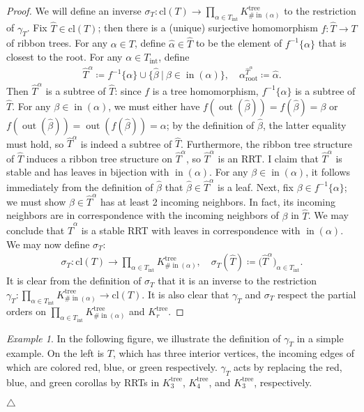\documentclass[11pt]{amsart}
\theoremstyle{definition}
\theoremstyle{remark}
\newtheorem{example}[theorem]{Example}
\theoremstyle{plain}
\newcommand{\on}{\operatorname}
\newcommand{\incom}{\on{in}}
\newcommand{\inte}{{\on{int}}}
\renewcommand{\root}{{\on{root}}}
\newcommand{\tree}{{\on{tree}}}
\newcommand{\cl}{\mathrm{cl}}
\newcommand{\out}{{\on{out}}}
\newcommand{\wh}{\widehat}
\begin{document}
\begin{proof}
We will define an inverse $\sigma_T\colon \cl(T) \to \prod_{\alpha\in T_\inte} K_{\#\!\incom(\alpha)}^\tree$ to the restriction of $\gamma_T$.
Fix $\wh T \in \cl(T)$; then there is a (unique) surjective homomorphism $f\colon \wh T \to T$ of ribbon trees.
For any $\alpha \in T$, define $\wh\alpha \in \wh T$ to be the element of $f^{-1}\{\alpha\}$ that is closest to the root.
For any $\alpha \in T_\inte$, define
\begin{align}
\wh T^\alpha \coloneqq f^{-1}\{\alpha\} \cup \bigl\{\wh\beta \:|\: \beta \in \incom(\alpha)\}, \quad \alpha_\root^{\wh T^\alpha} \coloneqq \wh \alpha.
\end{align}
Then $\wh T^\alpha$ is a subtree of $\wh T$: since $f$ is a tree homomorphism, $f^{-1}\{\alpha\}$ is a subtree of $\wh T$.
For any $\beta \in \incom(\alpha)$, we must either have $f(\out(\wh\beta)) = f(\wh\beta) = \beta$ or $f(\out(\wh\beta)) = \out(f(\wh\beta)) = \alpha$; by the definition of $\wh\beta$, the latter equality must hold, so $\wh T^\alpha$ is indeed a subtree of $\wh T$.
Furthermore, the ribbon tree structure of $\wh T$ induces a ribbon tree structure on $\wh T^\alpha$, so $\wh T^\alpha$ is an RRT.
I claim that $\wh T^\alpha$ is stable and has leaves in bijection with $\incom(\alpha)$.
For any $\beta \in \incom(\alpha)$, it follows immediately from the definition of $\wh\beta$ that $\wh\beta \in \wh T^\alpha$ is a leaf.
Next, fix $\beta \in f^{-1}\{\alpha\}$; we must show $\beta \in \wh T^\alpha$ has at least 2 incoming neighbors.
In fact, its incoming neighbors are in correspondence with the incoming neighbors of $\beta$ in $\wh T$.
We may conclude that $\wh T^\alpha$ is a stable RRT with leaves in correspondence with $\incom(\alpha)$.
We may now define $\sigma_T$:
\begin{align}
\sigma_T \colon \cl(T) \to \prod_{\alpha\in T_\inte} K_{\#\!\incom(\alpha)}^\tree, \quad \sigma_T(\wh T) \coloneqq \bigl(\wh T^\alpha\bigr)_{\alpha \in T_\inte}.	
\end{align}
It is clear from the definition of $\sigma_T$ that it is an inverse to the restriction $\gamma_T \colon \prod_{\alpha \in T_\inte} K_{\#\!\incom(\alpha)}^\tree \to \cl(T)$.
It is also clear that $\gamma_T$ and $\sigma_T$ respect the partial orders on $\prod_{\alpha \in T_\inte} K_{\#\!\incom(\alpha)}^\tree$ and $K_r^\tree$.
\end{proof}


\begin{example}
In the following figure, we illustrate the definition of $\gamma_T$ in a simple example.
On the left is $T$, which has three interior vertices, the incoming edges of which are colored red, blue, or green respectively.
$\gamma_T$ acts by replacing the red, blue, and green corollas by RRTs in $K_3^\tree$, $K_4^\tree$, and $K_3^\tree$, respectively.
\begin{figure}[H]
\centering
\def\svgwidth{0.9\columnwidth}

\label{fig:gamma_example}
\end{figure}
\null\hfill$\triangle$
\end{example}
\end{document}
